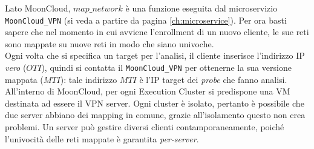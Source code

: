 Lato MoonCloud, $map\_network$ è una funzione eseguita dal microservizio
\texttt{MoonCloud\_VPN} (si veda a partire da pagina \ref{ch:microservice}).
Per ora basti sapere che nel momento
in cui avviene l'enrollment di un nuovo cliente, le sue reti sono mappate
su nuove reti in modo che siano univoche.\\
Ogni volta che si specifica un target per l'analisi, il cliente inserisce l'indirizzo IP
\textit{vero} ($OTI$), quindi si contatta il \texttt{MoonCloud\_VPN} per ottenerne
la sua versione mappata ($MTI$): tale indirizzo $MTI$ è l'IP target dei \textit{probe}
che fanno analisi.\\
All'interno di MoonCloud, per ogni Execution Cluster si predispone una VM destinata ad
essere il VPN server. Ogni cluster è isolato, pertanto è possibile che due server abbiano
dei mapping in comune, grazie all'isolamento questo non crea problemi.
Un server può gestire diversi clienti
contamporaneamente, poiché l'univocità delle reti mappate è garantita \textit{per-server}.


